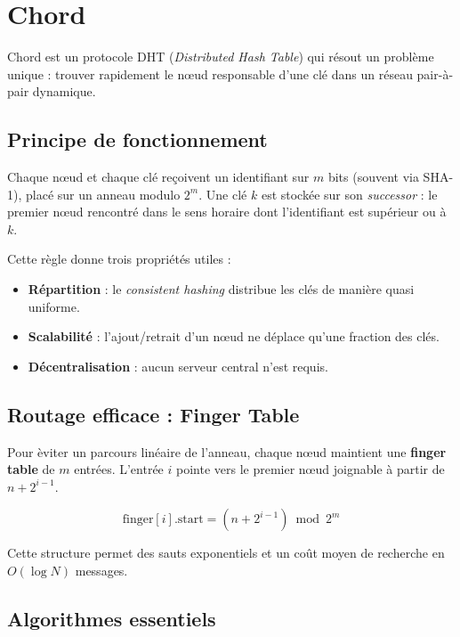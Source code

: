 \section{Chord}

Chord est un protocole DHT (\emph{Distributed Hash Table}) qui r\'esout un probl\`eme unique : trouver rapidement le n\oe ud responsable d'une cl\'e dans un r\'eseau pair-\`a-pair dynamique.

\subsection{Principe de fonctionnement}

Chaque n\oe ud et chaque cl\'e re\c coivent un identifiant sur \(m\) bits (souvent via SHA-1), plac\'e sur un anneau modulo \(2^m\). Une cl\'e \(k\) est stock\'ee sur son \emph{successor} : le premier n\oe ud rencontr\'e dans le sens horaire dont l'identifiant est sup\'erieur ou \`a \(k\).

Cette r\`egle donne trois propri\'et\'es utiles :
\begin{itemize}
\item \textbf{R\'epartition} : le \emph{consistent hashing} distribue les cl\'es de mani\`ere quasi uniforme.
\item \textbf{Scalabilit\'e} : l'ajout/retrait d'un n\oe ud ne d\'eplace qu'une fraction des cl\'es.
\item \textbf{D\'ecentralisation} : aucun serveur central n'est requis.
\end{itemize}

\subsection{Routage efficace : Finger Table}

Pour \`eviter un parcours lin\'eaire de l'anneau, chaque n\oe ud maintient une \textbf{finger table} de \(m\) entr\'ees. L'entr\'ee \(i\) pointe vers le premier n\oe ud joignable \`a partir de \(n + 2^{i-1}\).

\[
\text{finger}[i].\text{start} = (n + 2^{i-1}) \bmod 2^m
\]

Cette structure permet des sauts exponentiels et un co\^ut moyen de recherche en \(O(\log N)\) messages.

\subsection{Algorithmes essentiels}

